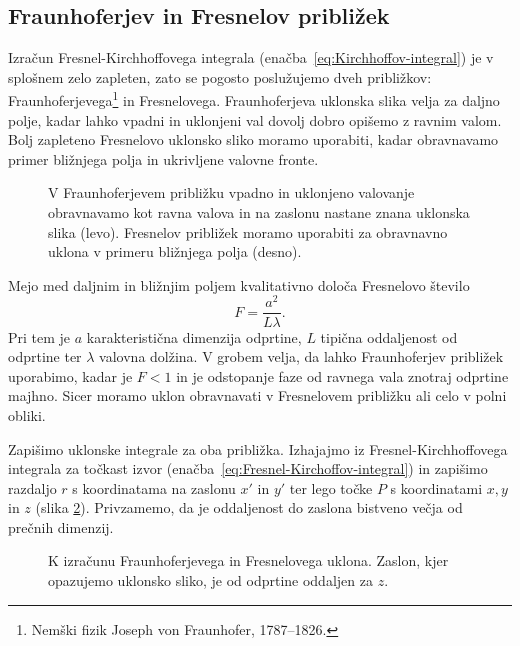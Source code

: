 \subsection*{Fraunhoferjev in Fresnelov približek}
\label{FFuklon}
Izračun Fresnel-Kirchhoffovega integrala (enačba~\ref{eq:Kirchhoffov-integral}) 
je v splošnem zelo zapleten, zato se 
pogosto poslužujemo dveh približkov: Fraunhoferjevega\footnote{Nemški fizik 
Joseph von Fraunhofer, 1787--1826.} in Fresnelovega. 
Fraunhoferjeva uklonska slika velja za daljno polje, kadar lahko 
vpadni in uklonjeni val dovolj dobro opišemo z ravnim valom. 
Bolj zapleteno Fresnelovo uklonsko sliko moramo uporabiti, kadar obravnavamo 
primer bližnjega polja in ukrivljene valovne fronte.
\begin{figure}[h]
\centering {} 
  
\caption{V Fraunhoferjevem približku vpadno in uklonjeno valovanje obravnavamo kot ravna valova 
in na zaslonu nastane znana uklonska slika (levo). Fresnelov približek moramo uporabiti za obravnavno uklona v 
primeru bližnjega polja (desno).}
\label{fig:UklonFF}
\end{figure}

Mejo med daljnim in bližnjim poljem kvalitativno določa Fresnelovo 
število
\begin{equation}
F= \frac{a^2}{L\lambda}.
\label{eq:Fst}
\end{equation} 
Pri tem je $a$ karakteristična dimenzija odprtine, $L$ tipična oddaljenost od odprtine ter
$\lambda$ valovna dolžina. V grobem velja, da lahko Fraunhoferjev približek uporabimo,
kadar je $F<1$ in je odstopanje
faze od ravnega vala znotraj odprtine majhno. Sicer moramo uklon obravnavati v Fresnelovem 
približku ali celo v polni obliki. 

Zapišimo uklonske integrale za oba približka. Izhajajmo iz Fresnel-Kirchhoffovega integrala
za točkast izvor
(enačba~\ref{eq:Fresnel-Kirchoffov-integral}) in zapišimo razdaljo $r$ s koordinatama na 
zaslonu $x'$ in $y'$ ter
lego točke $P$ s koordinatami $x,y$ in $z$ (slika \ref{fig:Uklon-koordinate}). Privzamemo,
da je oddaljenost do zaslona bistveno večja od prečnih dimenzij. 

\begin{figure}[h]
\centering {} 
  
\caption{K izračunu Fraunhoferjevega in Fresnelovega uklona. Zaslon, kjer opazujemo uklonsko sliko,
je od odprtine oddaljen za $z$.}
\label{fig:Uklon-koordinate}
\end{figure}

